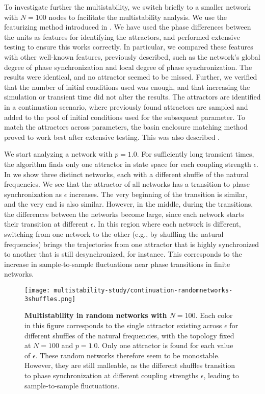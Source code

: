 To investigate further the multistability, we switch briefly to a smaller network with $N=100$ nodes to facilitate the multistability analysis. We use the featurizing method introduced in . We have used the phase differences between the units as features for identifying the attractors, and performed extensive testing to ensure this works correctly. In particular, we compared these features with other well-known features, previously described, such as the network's global degree of phase synchronization and local degree of phase synchronization. The results were identical, and no attractor seemed to be missed. Further, we verified that the number of initial conditions used was enough, and that increasing the simulation or transient time did not alter the results. The attractors are identified in a continuation scenario, where previously found attractors are sampled and added to the pool of initial conditions used for the subsequent parameter. To match the attractors across parameters, the basin enclosure matching method proved to work best after extensive testing. This was also described .

We start analyzing a network with $p=1.0$. For sufficiently long transient times, the algorithm finds only one attractor in state space for each coupling strength $\epsilon$. In  we show three distinct networks, each with a different shuffle of the natural frequencies. We see that the attractor of all networks has a transition to phase synchronization as $\epsilon$ increases. The very beginning of the transition is similar, and the very end is also similar. However, in the middle, during the transitions, the differences between the networks become large, since each network starts their transition at different $\epsilon$. In this region where each network is different, switching from one network to the other (e.g., by shuffling the natural frequencies) brings the trajectories from one attractor that is highly synchronized to another that is still desynchronized, for instance. This corresponds to the increase in sample-to-sample fluctuations near phase transitions in finite networks.
%
\begin{figure}[htb!]
    \centering
    \texttt{[image: multistability-study/continuation-randomnetworks-3shuffles.png]}
    \caption{\textbf{Multistability in random networks with $N=100$}. Each color in this figure corresponds to the single attractor existing across $\epsilon$ for different shuffles of the natural frequencies, with the topology fixed at $N=100$ and $p=1.0$. Only one attractor is found for each value of $\epsilon$. These random networks therefore seem to be monostable. However, they are still malleable, as the different shuffles transition to phase synchronization at different coupling strengths $\epsilon$, leading to sample-to-sample fluctuations.}
    \label{fig:multistability-random}
\end{figure}

